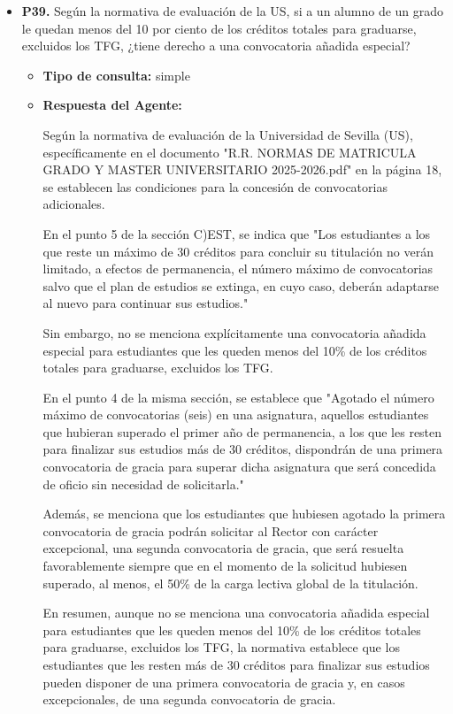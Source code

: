 \documentclass{article}
\begin{document}
\begin{itemize}
  \item \textbf{P39.} Según la normativa de evaluación de la US, si a un alumno de un grado le quedan menos del 10 por ciento de los créditos totales para graduarse, excluidos los TFG, ¿tiene derecho a una convocatoria añadida especial? \\
        \begin{itemize}
          \item \textbf{Tipo de consulta:} simple
          \item \textbf{Respuesta del Agente:}

                Según la normativa de evaluación de la Universidad de Sevilla (US), específicamente en el documento "R.R. NORMAS DE MATRICULA GRADO Y MASTER UNIVERSITARIO 2025-2026.pdf" en la página 18, se establecen las condiciones para la concesión de convocatorias adicionales.

                En el punto 5 de la sección C)EST, se indica que "Los estudiantes a los que reste un máximo de 30 créditos para concluir su titulación no verán limitado, a efectos de permanencia, el número máximo de convocatorias salvo que el plan de estudios se extinga, en cuyo caso, deberán adaptarse al nuevo para continuar sus estudios."

                Sin embargo, no se menciona explícitamente una convocatoria añadida especial para estudiantes que les queden menos del 10\% de los créditos totales para graduarse, excluidos los TFG.

                En el punto 4 de la misma sección, se establece que "Agotado el número máximo de convocatorias (seis) en una asignatura, aquellos estudiantes que hubieran superado el primer año de permanencia, a los que les resten para finalizar sus estudios más de 30 créditos, dispondrán de una primera convocatoria de gracia para superar dicha asignatura que será concedida de oficio sin necesidad de solicitarla."

                Además, se menciona que los estudiantes que hubiesen agotado la primera convocatoria de gracia podrán solicitar al Rector con carácter excepcional, una segunda convocatoria de gracia, que será resuelta favorablemente siempre que en el momento de la solicitud hubiesen superado, al menos, el 50\% de la carga lectiva global de la titulación.

                En resumen, aunque no se menciona una convocatoria añadida especial para estudiantes que les queden menos del 10\% de los créditos totales para graduarse, excluidos los TFG, la normativa establece que los estudiantes que les resten más de 30 créditos para finalizar sus estudios pueden disponer de una primera convocatoria de gracia y, en casos excepcionales, de una segunda convocatoria de gracia.


\end{itemize}
\end{itemize}
\end{document}
